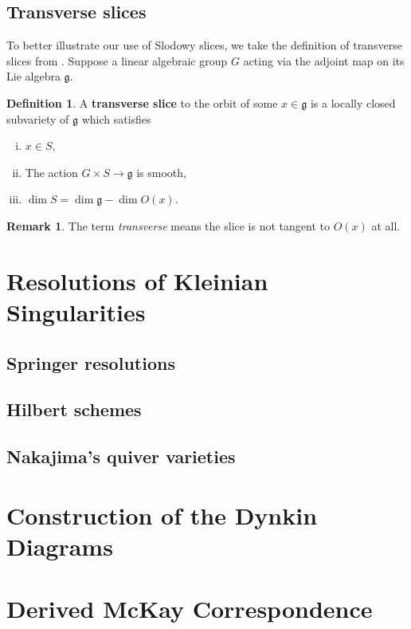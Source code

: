 \documentclass[12pt]{report}
\theoremstyle{remark}
\theoremstyle{definition}
\newtheorem{remark}{Remark}[section]
\newtheorem{definition}{Definition}[section]
\begin{document}
    \subsection{Transverse slices}
    To better illustrate our use of Slodowy slices, we take the definition of transverse slices from \cite{slodowy_1980}. Suppose a linear algebraic group $G$ acting via the adjoint map on its Lie algebra $\mathfrak g$. 
    \begin{definition}
        A \textbf{transverse slice} to the orbit of some $x\in \mathfrak g$ is a locally closed subvariety of $\mathfrak g$ which satisfies
        \begin{enumerate}[(i)]
            \item $x\in S$,
            \item The action $G\times S\to \mathfrak g$ is smooth,
            \item $\dim S=\dim\mathfrak g-\dim O(x)$.
        \end{enumerate}
    \end{definition}
    \begin{remark}
        The term \textit{transverse} means the slice is not tangent to $O(x)$ at all.
    \end{remark}
    \section{Resolutions of Kleinian Singularities}
    \subsection{Springer resolutions}
    \subsection{Hilbert schemes}
    \subsection{Nakajima's quiver varieties}
    \section{Construction of the Dynkin Diagrams}
    \section{Derived McKay Correspondence}
    
    \renewcommand{\section}[2]{\vskip 0.01em}
    \printbibliography
\end{document}
